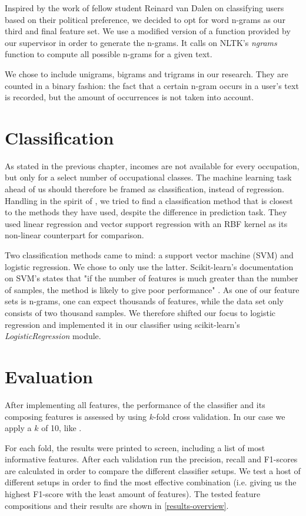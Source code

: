 \documentclass[
10pt, %
a4paper, %
oneside, %
headinclude,footinclude, %
] {book}%
\begin{document}
Inspired by the work of fellow student Reinard van Dalen on classifying users based on their political preference, we decided to opt for word n-grams as our third and final feature set. We use a modified version of a function provided by our supervisor in order to generate the n-grams. It calls on NLTK's \textit{ngrams} function to compute all possible n-grams for a given text.

We chose to include unigrams, bigrams and trigrams in our research. They are counted in a binary fashion: the fact that a certain n-gram occurs in a user's text is recorded, but the amount of occurrences is not taken into account.

\section{Classification}
As stated in the previous chapter, incomes are not available for every occupation, but only for a select number of occupational classes. The machine learning task ahead of us should therefore be framed as classification, instead of regression.
Handling in the spirit of \citet{flekova}, we tried to find a classification method that is closest to the methods they have used, despite the difference in prediction task. They used linear regression and vector support regression with an RBF kernel as its non-linear counterpart for comparison. 

Two classification methods came to mind: a support vector machine (SVM) and logistic regression. We chose to only use the latter. Scikit-learn's documentation on SVM's states that "if the number of features is much greater than the number of samples, the method is likely to give poor performance" \citep{svm}.
As one of our feature sets is n-grams, one can expect thousands of features, while the data set only consists of two thousand samples. We therefore shifted our focus to logistic regression and implemented it in our classifier using scikit-learn's \textit{LogisticRegression} module.

\section{Evaluation}
After implementing all features, the performance of the classifier and its composing features is assessed by using $k$-fold cross validation. In our case we apply a $k$ of 10, like \citet{flekova}.

For each fold, the results were printed to screen, including a list of most informative features. After each validation run the precision, recall and F1-scores are calculated in order to compare the different classifier setups. We test a host of different setups in order to find the most effective combination (i.e. giving us the highest F1-score with the least amount of features).  The tested feature compositions and their results are shown in  \autoref{results-overview}.
\end{document}
